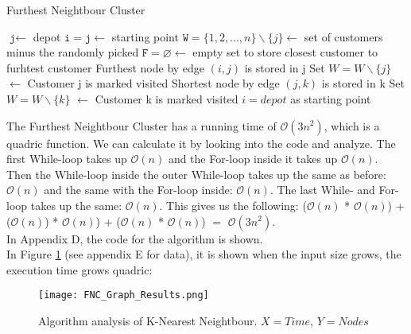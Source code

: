 \documentclass[12pt]{article}
\newcommand{\var}{\texttt}
\begin{document}
\begin{algorithm}[!ht]
	\caption{Furthest Neightbour Cluster}\label{euclid}
	\begin{algorithmic}[1]
	\State $\var{j} \gets$ depot
	\State $\var{i} = \var{j} \gets$ starting point
	\State $\var{W} = \{1, 2, ..., n\} \backslash \{j\} \gets$ set of customers minus the randomly picked
	\State $\var{F} = \varnothing \gets$ empty set to store closest customer to furhtest customer
			\State {}
			\State Furthest node by edge $(i,j)$ is stored in j
			\State Set $W = W \backslash \{j\}$ $\gets$ Customer j is marked visited
				\State {}
				\State Shortest node by edge $(j,k)$ is stored in k
				\State Set $W = W \backslash \{k\}$ $\gets$ Customer k is marked visited
				\State $i = depot$ as starting point
			\EndWhile
		\EndWhile
	\EndFunction

	\end{algorithmic}
\end{algorithm}

The Furthest Neightbour Cluster has a running time of $\mathcal{O}(3n^2)$, which is a quadric function. We can calculate it by looking into the code and analyze. The first While-loop takes up $\mathcal{O}(n)$ and the For-loop inside it takes up $\mathcal{O}(n)$. Then the While-loop inside the outer While-loop takes up the same as before: $\mathcal{O}(n)$ and the same with the For-loop inside: $\mathcal{O}(n)$. The last While- and For-loop takes up the same: $\mathcal{O}(n)$. This gives us the following: ($\mathcal{O}(n)$ * $\mathcal{O}(n)$) + ($\mathcal{O}(n)$) * $\mathcal{O}(n)$) + ($\mathcal{O}(n)$ * $\mathcal{O}(n)$) $=$ $\mathcal{O}(3n^2)$. \\
In Appendix D, the code for the algorithm is shown.\\
In Figure \ref{fig:fncanalysis} (see appendix E for data), it is shown when the input size grows, the execution time grows quadric:

\begin{figure}[H]
	\caption{Algorithm analysis of K-Nearest Neightbour. $X = Time$, $Y = Nodes$}
	\centering
	\texttt{[image: FNC\_Graph\_Results.png]}
	\label{fig:fncanalysis}

\end{figure}
\end{document}
